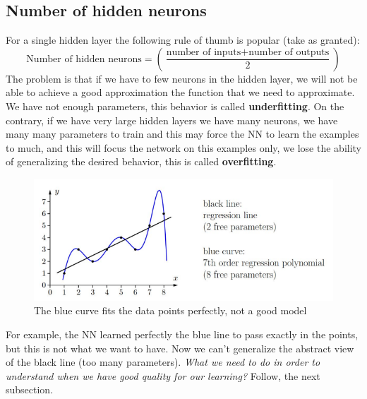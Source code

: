 \documentclass{article}
\begin{document}
\subsection{Number of hidden neurons}
For a single hidden layer the following rule of thumb is popular (take as granted):
$$\text{Number of hidden neurons} = \left(\frac{\text{number of inputs}+\text{number of outputs}}{2}\right)$$
The problem is that if we have to few neurons in the hidden layer, we will not be able to achieve a good approximation
the function that we need to approximate. We have not enough parameters, this behavior is called \textbf{underfitting}.
\newline\newline
On the contrary, if we have very large hidden layers we have many neurons, we have many many parameters to train and this may force the
NN to learn the examples to much, and this will focus the network on this examples only, we lose the ability of
generalizing the desired behavior, this is called \textbf{overfitting}.
\begin{figure}[H]
    \centering
    \includegraphics[scale=0.6]{images/overfitting.png}
    \caption{The blue curve fits the data points perfectly, not a good model}
\end{figure}
For example, the NN learned perfectly the blue line to pass exactly in the points, but this is not what we
want to have. Now we can't generalize the abstract view of the black line (too many parameters).
\newline\newline
\textit{What we need to do in order to understand when we have good quality for our learning?} Follow, the
next subsection.
\end{document}
